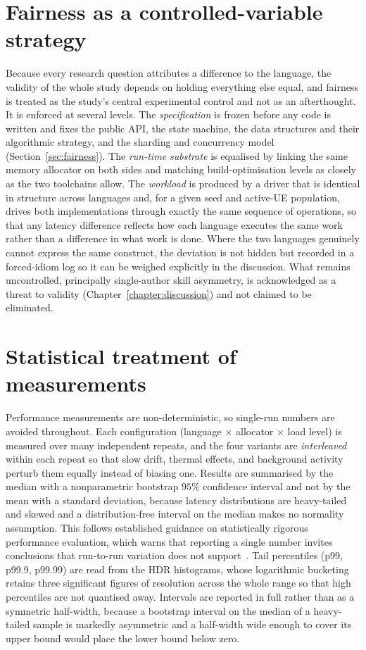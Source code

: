 \documentclass[english,twoside,openright,a4paper,censored,csm,software-track-2020]{HYthesisML}
\begin{document}
\section{Fairness as a controlled-variable strategy}
Because every research question attributes a difference to the language, the validity of the
whole study depends on holding everything else equal, and fairness is treated as the study's
central experimental control and not as an afterthought. It is enforced at several levels.
The \emph{specification} is frozen before any code is written and fixes the public API, the
state machine, the data structures and their algorithmic strategy, and the sharding and
concurrency model (Section~\ref{sec:fairness}). The \emph{run-time substrate} is equalised by
linking the same memory allocator on both sides and matching build-optimisation levels as
closely as the two toolchains allow. The \emph{workload} is produced by a driver that is
identical in structure across languages and, for a given seed and active-UE population, drives
both implementations through exactly the same sequence of operations, so that any latency
difference reflects how each language executes the same work rather than a difference in what
work is done. Where the two languages genuinely cannot express the same construct, the deviation
is not hidden but recorded in a forced-idiom log so it can be weighed explicitly in the
discussion. What remains uncontrolled, principally single-author skill asymmetry, is
acknowledged as a threat to validity (Chapter~\ref{chapter:discussion}) and not claimed to
be eliminated.

\section{Statistical treatment of measurements}\label{sec:stats}
Performance measurements are non-deterministic, so single-run numbers are avoided throughout.
Each configuration (language $\times$ allocator $\times$ load level) is measured over many
independent repeats, and the four variants are \emph{interleaved} within each repeat so that
slow drift, thermal effects, and background activity perturb them equally instead of biasing
one. Results are summarised by the median with a nonparametric bootstrap $95\%$ confidence
interval and not by the mean with a standard deviation, because latency distributions are
heavy-tailed and skewed and a distribution-free interval on the median makes no normality
assumption. This follows established guidance on statistically rigorous performance evaluation,
which warns that reporting a single number invites conclusions that run-to-run variation does
not support~\cite{georges2007rigorous}. Tail percentiles (p99, p99.9, p99.99) are read from the
HDR histograms, whose logarithmic bucketing retains three significant figures of resolution
across the whole range so that high percentiles are not quantised away. Intervals are reported
in full rather than as a symmetric half-width, because a bootstrap interval on the median of a
heavy-tailed sample is markedly asymmetric and a half-width wide enough to cover its upper
bound would place the lower bound below zero.
\end{document}
